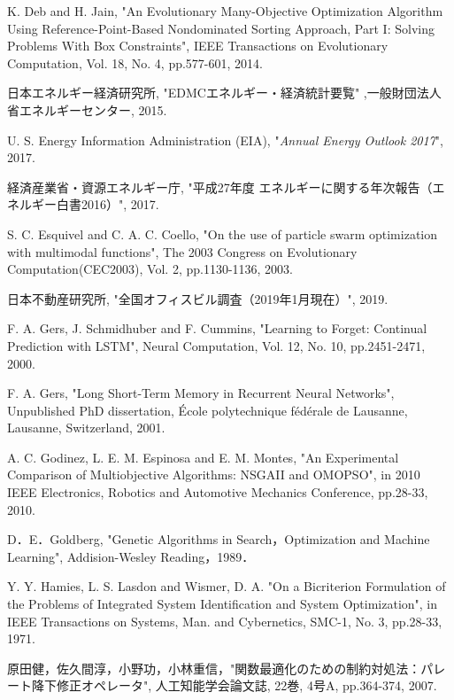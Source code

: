 \begin{thebibliography}{99}
     K. Deb and H. Jain, "An Evolutionary Many-Objective Optimization Algorithm Using Reference-Point-Based Nondominated Sorting Approach, Part I: Solving Problems With Box Constraints", IEEE Transactions on Evolutionary Computation, Vol. 18, No. 4, pp.577-601, 2014.

     日本エネルギー経済研究所, "EDMCエネルギー・経済統計要覧" ,一般財団法人省エネルギーセンター, 2015.

     U. S. Energy Information Administration (EIA), "{\em Annual Energy Outlook 2017}", 2017.

     経済産業省・資源エネルギー庁, "平成27年度 エネルギーに関する年次報告（エネルギー白書2016）", 2017.

     S. C. Esquivel and C. A. C. Coello, "On the use of particle swarm optimization with multimodal functions", The 2003 Congress on Evolutionary Computation(CEC2003), Vol. 2, pp.1130-1136, 2003.

     日本不動産研究所, "全国オフィスビル調査（2019年1月現在）", 2019.

     F. A. Gers, J. Schmidhuber and F. Cummins, "Learning to Forget: Continual Prediction with LSTM", Neural Computation, Vol. 12, No. 10, pp.2451-2471, 2000.

     F. A. Gers, "Long Short-Term Memory in Recurrent Neural Networks", Unpublished PhD dissertation, École polytechnique fédérale de Lausanne, Lausanne, Switzerland, 2001.

     A. C. Godinez, L. E. M. Espinosa and E. M. Montes, "An Experimental Comparison of Multiobjective Algorithms: NSGAII and OMOPSO", in 2010 IEEE Electronics, Robotics and Automotive Mechanics Conference, pp.28-33, 2010.

     D．E．Goldberg, "Genetic Algorithms in Search，Optimization and Machine Learning", Addision-Wesley Reading，1989．

     Y. Y. Hamies, L. S. Lasdon and Wismer, D. A. "On a
    Bicriterion Formulation of the Problems of Integrated System Identification and System Optimization", in IEEE Transactions on Systems, Man. and Cybernetics, SMC-1, No. 3, pp.28-33, 1971.

     原田健，佐久間淳，小野功，小林重信，"関数最適化のための制約対処法：パレート降下修正オペレータ", 人工知能学会論文誌, 22巻, 4号A, pp.364-374, 2007.


\end{thebibliography}

